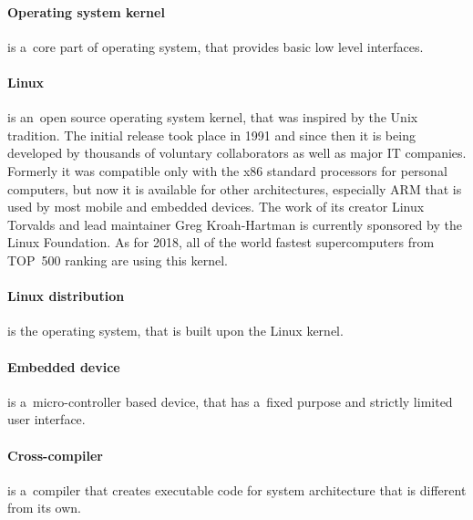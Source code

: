 \documentclass[printmode]{mgr}
\begin{document}
\paragraph{Operating system kernel} is a~core part of operating system, that provides  basic low level interfaces.\cite{web:def-kernel}

\paragraph{Linux} is an~open source operating system kernel, that was inspired by the Unix tradition. The initial release took place in 1991 and since then it is being developed by thousands of voluntary collaborators as well as major IT companies. Formerly it was compatible only with the x86 standard processors for personal computers, but now it is available for other architectures, especially ARM that is used by most mobile and embedded devices. The work of its creator Linux Torvalds and lead maintainer Greg Kroah-Hartman is currently sponsored by the Linux Foundation. As for 2018, all of the world fastest supercomputers from TOP~500 ranking are using this kernel.

\paragraph{Linux distribution} is the operating system, that is built upon the Linux kernel.


\paragraph{Embedded device} is a~micro-controller based device, that has a~fixed purpose and strictly limited user interface.

\paragraph{Cross-compiler} is a~compiler that creates executable code for system architecture that is different from its own.
\end{document}
